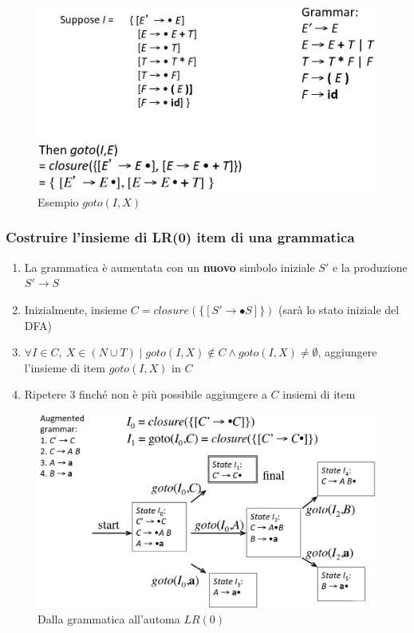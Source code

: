 \begin{figure}[H]
\centering
\includegraphics[scale=0.45]{res/image/goto_item}
\caption{Esempio $goto(I,X)$}
\label{img:goto_item}
\end{figure}

\subsubsection{Costruire l'insieme di LR(0) item di una grammatica}
\begin{enumerate}
\item La grammatica \`e aumentata con un \textbf{nuovo} simbolo iniziale $S'$ e
la produzione $S' \to S$
\item Inizialmente, insieme $C = closure(\{[S' \to \bullet S]\})$ (sar\`a lo
stato iniziale del DFA)
\item $\forall I \in C, \ X \in (N \cup T) \mid goto(I,X) \notin C \land
goto(I,X) \neq \emptyset$, aggiungere l'insieme di item $goto(I,X)$ in $C$
\item Ripetere 3 finch\'e non \`e pi\`u possibile aggiungere a $C$ insiemi di
item
\end{enumerate}

\begin{figure}[H]
\centering
\includegraphics[scale=0.35]{res/image/LR_automaton}
\caption{Dalla grammatica all'automa $LR(0)$}
\label{img:LR_automaton}
\end{figure}

